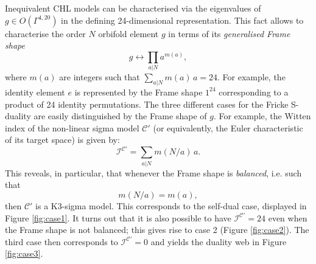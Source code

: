 \documentclass[a4paper,11pt]{article}
\newcommand{\C}{\mathcal{C}}
\newcommand{\I}{\mathcal{I}}
\numberwithin{equation}{section}
\def\be{\begin{equation}}
\def\ee{\end{equation}}
\begin{document}
Inequivalent CHL models can be characterised via the eigenvalues of $g\in O(\Gamma^{4,20})$ in the defining 24-dimensional representation. This fact allows to characterise the order $N$ orbifold element $g$ in terms of its \emph{generalised Frame shape}
\be
g \longleftrightarrow \prod_{a|N} a^{m(a)},
\label{frameshape}
\ee
where $m(a)$ are integers such that $\sum_{a|N} m(a) \, a=24$. For example, the identity element $e$ is represented by the Frame shape $1^{24}$ corresponding to a product of 24 identity permutations. 
The three different cases for the Fricke S-duality are easily distinguished by the Frame shape of $g$. For example, the Witten index of the non-linear sigma model $\C'$ (or equivalently, the Euler characteristic of its target space)  is given by:
\be
\I^{\C'}=\sum_{a|N} m(N/a)\, a. 
\ee
This reveals, in particular, that whenever the Frame shape is \emph{balanced}, i.e. such that 
\be
m(N/a)=m(a),
\ee
then $\mathcal{C}'$ is a K3-sigma model. This corresponds to the self-dual case, displayed in Figure \ref{fig:case1}. It turns out that it is also possible to have $\I^{\C'} =24$ even when the Frame shape is not balanced; this gives rise to case 2 (Figure \ref{fig:case2}). The third case then corresponds to $\I^{\C'} =0$ and yields the duality web in Figure \ref{fig:case3}.  
\end{document}
